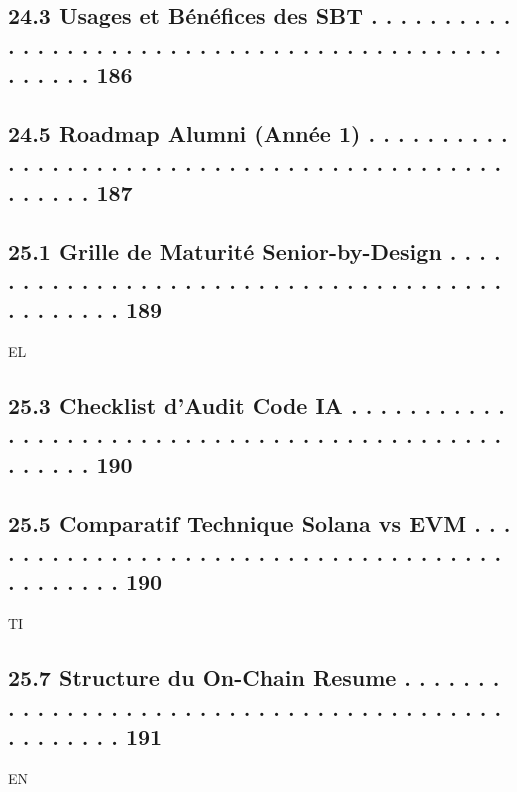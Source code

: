 \subsection{24.3 Usages et Bénéfices des SBT . . . . . . . . . . . . . . . . . . . . . . . . . . . . . . . . . . . . . . . . . . . . . . . . . . 186}
\subsection{24.5 Roadmap Alumni (Année 1) . . . . . . . . . . . . . . . . . . . . . . . . . . . . . . . . . . . . . . . . . . . . . . . . . . 187}
\vspace{0.5em}
\subsection{25.1 Grille de Maturité Senior-by-Design . . . . . . . . . . . . . . . . . . . . . . . . . . . . . . . . . . . . . . . . . . . . . . 189}
\vspace{0.5em}
\vspace{0.5em}
\vspace{0.5em}
\vspace{0.5em}
EL\\
\subsection{25.3 Checklist d’Audit Code IA . . . . . . . . . . . . . . . . . . . . . . . . . . . . . . . . . . . . . . . . . . . . . . . . . . . 190}
\subsection{25.5 Comparatif Technique Solana vs EVM . . . . . . . . . . . . . . . . . . . . . . . . . . . . . . . . . . . . . . . . . . . . . 190}
\vspace{0.5em}
\vspace{0.5em}
\vspace{0.5em}
\vspace{0.5em}
TI\\
\subsection{25.7 Structure du On-Chain Resume . . . . . . . . . . . . . . . . . . . . . . . . . . . . . . . . . . . . . . . . . . . . . . . . . 191}
\vspace{0.5em}
\vspace{0.5em}
\vspace{0.5em}
\vspace{0.5em}
EN\\
